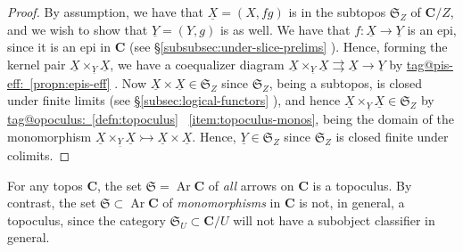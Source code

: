 \documentclass{amsart}
\makeatletter
\newcommand\Ar{\operatorname{Ar}}
\newcommand\bC{\mathbf{C}}
\newcommand\fS{\mathfrak{S}}
\newcommand\toto{\rightrightarrows}
\newcommand\tto{\rightarrowtail}
\newcommand\und[1]{\underline{#1}}
\newcommand\tagword[1]{\csname tag@#1\endcsname}
\def\label@tag#1:#2\@nil{#1}
\newcommand\labeltag[1]{\label@tag#1:\@nil}
\newcommand\jref[1]{%
  \texorpdfstring%
    {\hyperref[#1]{\tagword{\labeltag{#1}}~\ref*{#1}}}%
    {\tagword{\labeltag{#1}}~\ref*{#1}}%
}
\newcommand\prerefpost[3]{%
  \texorpdfstring%
    {\hyperref[#2]{#1\ref*{#2}#3}}%
    {#1\ref*{#2}#3}%
}
\newcommand\sref[1]{\prerefpost{\S}{#1}{}}
\theoremstyle{definition}
\theoremstyle{remark}
\theoremstyle{plainwithref}
\makeatother
\begin{document}
\begin{proof}
  By assumption, we have that \( \und{X} = (X, f g) \) is in the subtopos \( \fS_Z \) of \( \bC / Z \), and we wish to show that \( \und Y = (Y, g) \) is as well.
  We have that \( f \colon \und X \to \und Y \) is an epi, since it is an epi in \( \bC \) (see \sref{subsubsec:under-slice-prelims}).
  Hence, forming the kernel pair \( \und X \times_{\und Y} \und X \), we have a coequalizer diagram \( \und X \times_{\und Y} \und X \toto \und X \to \und Y \) by \jref{propn:epis-eff}.
  Now \( \und X \times \und X \in \fS_Z \) since \( \fS_Z \), being a subtopos, is closed under finite limits (see \sref{subsec:logical-functors}), and hence \( \und X \times_{\und Y} \und X \in \fS_Z \) by \jref{defn:topoculus}~\ref{item:topoculus-monos}, being the domain of the monomorphism \( \und X \times_{\und Y} \und X \tto \und X \times \und X \).
  Hence, \( \und Y \in \fS_Z \) since \( \fS_Z \) is closed finite under colimits.
\end{proof}

\begin{exm}
  For any topos \( \bC \), the set \( \fS = \Ar \bC \) of \emph{all} arrows on \( \bC \) is a topoculus.
  By contrast, the set \( \fS \subset \Ar \bC \) of \emph{monomorphisms} in \( \bC \) is not, in general, a topoculus, since the category \( \fS_U \subset \bC / U \) will not have a subobject classifier in general.
\end{exm}
\end{document}
